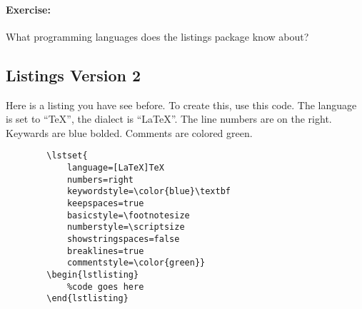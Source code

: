         \paragraph{Exercise:} What programming languages does the listings package know about?

        \subsection{Listings Version 2}
        \label{Listings Version 2}
        
        Here is a listing you have see before. To create this, use this code. The language is set to ``TeX'', the dialect is ``LaTeX''. The line numbers are on the right. Keywards are blue bolded. Comments are colored green.

        \begin{verbatim}
        \lstset{
            language=[LaTeX]TeX
            numbers=right
            keywordstyle=\color{blue}\textbf
            keepspaces=true
            basicstyle=\footnotesize
            numberstyle=\scriptsize
            showstringspaces=false
            breaklines=true
            commentstyle=\color{green}}
        \begin{lstlisting}
            %code goes here
        \end{lstlisting}
        \end{verbatim}

